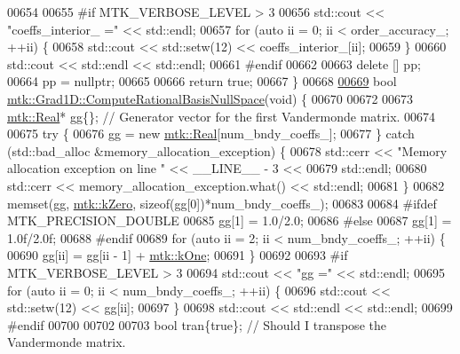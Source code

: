 \begin{DoxyCode}
{{00654 
00655 \textcolor{preprocessor}{  #if MTK\_VERBOSE\_LEVEL > 3}
00656   std::cout << \textcolor{stringliteral}{"coeffs\_interior\_ ="} << std::endl;
00657   \textcolor{keywordflow}{for} (\textcolor{keyword}{auto} ii = 0; ii < order\_accuracy\_; ++ii) \{
00658     std::cout << std::setw(12) << coeffs\_interior\_[ii];
00659   \}
00660   std::cout << std::endl << std::endl;
00661 \textcolor{preprocessor}{  #endif}
00662 
00663   \textcolor{keyword}{delete} [] pp;
00664   pp = \textcolor{keyword}{nullptr};
00665 
00666   \textcolor{keywordflow}{return} \textcolor{keyword}{true};
00667 \}
00668 
\hypertarget{mtk__grad__1d_8cc_source_l00669}{}\hyperlink{classmtk_1_1Grad1D_a2d03e6a3961bee558f575ec4099782a9}{00669} \textcolor{keywordtype}{bool} \hyperlink{classmtk_1_1Grad1D_a2d03e6a3961bee558f575ec4099782a9}{mtk::Grad1D::ComputeRationalBasisNullSpace}(\textcolor{keywordtype}{void}) \{
00670 
00672 
00673   \hyperlink{group__c01-roots_gac080bbbf5cbb5502c9f00405f894857d}{mtk::Real}* gg\{\}; \textcolor{comment}{// Generator vector for the first Vandermonde matrix.}
00674 
00675   \textcolor{keywordflow}{try} \{
00676     gg = \textcolor{keyword}{new} \hyperlink{group__c01-roots_gac080bbbf5cbb5502c9f00405f894857d}{mtk::Real}[num\_bndy\_coeffs\_];
00677   \} \textcolor{keywordflow}{catch} (std::bad\_alloc &memory\_allocation\_exception) \{
00678     std::cerr << \textcolor{stringliteral}{"Memory allocation exception on line "} << \_\_LINE\_\_ - 3 <<
00679       std::endl;
00680     std::cerr << memory\_allocation\_exception.what() << std::endl;
00681   \}
00682   memset(gg, \hyperlink{group__c01-roots_ga59a451a5fae30d59649bcda274fea271}{mtk::kZero}, \textcolor{keyword}{sizeof}(gg[0])*num\_bndy\_coeffs\_);
00683 
00684 \textcolor{preprocessor}{  #ifdef MTK\_PRECISION\_DOUBLE}
00685   gg[1] = 1.0/2.0;
00686 \textcolor{preprocessor}{  #else}
00687   gg[1] = 1.0f/2.0f;
00688 \textcolor{preprocessor}{  #endif}
00689   \textcolor{keywordflow}{for} (\textcolor{keyword}{auto} ii = 2; ii < num\_bndy\_coeffs\_; ++ii) \{
00690     gg[ii] = gg[ii - 1] + \hyperlink{group__c01-roots_ga26407c24d43b6b95480943340d285c71}{mtk::kOne};
00691   \}
00692 
00693 \textcolor{preprocessor}{  #if MTK\_VERBOSE\_LEVEL > 3}
00694   std::cout << \textcolor{stringliteral}{"gg ="} << std::endl;
00695   \textcolor{keywordflow}{for} (\textcolor{keyword}{auto} ii = 0; ii < num\_bndy\_coeffs\_; ++ii) \{
00696     std::cout << std::setw(12) << gg[ii];
00697   \}
00698   std::cout << std::endl << std::endl;
00699 \textcolor{preprocessor}{  #endif}
00700 
00702 
00703   \textcolor{keywordtype}{bool} tran\{\textcolor{keyword}{true}\}; \textcolor{comment}{// Should I transpose the Vandermonde matrix.}
}}
\end{DoxyCode}
